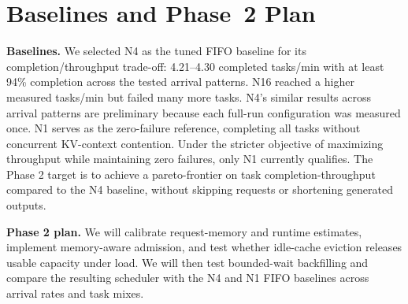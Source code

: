 \documentclass[10pt,twocolumn,letterpaper]{article}
\begin{document}
\balance
\section{Baselines and Phase~2 Plan}
\textbf{Baselines.} We selected N4 as the tuned FIFO baseline for its completion/throughput trade-off: 4.21--4.30 completed tasks/min with at least 94\% completion across the tested arrival patterns. N16 reached a higher measured tasks/min but failed many more tasks. N4's similar results across arrival patterns are preliminary because each full-run configuration was measured once. N1 serves as the zero-failure reference, completing all tasks without concurrent KV-context contention. Under the stricter objective of maximizing throughput while maintaining zero failures, only N1 currently qualifies. The Phase 2 target is to achieve a pareto-frontier on task completion-throughput compared to the N4 baseline, without skipping requests or shortening generated outputs.


\textbf{Phase 2 plan.} We will calibrate request-memory and runtime estimates, implement memory-aware admission, and test whether idle-cache eviction releases usable capacity under load. We will then test bounded-wait backfilling and compare the resulting scheduler with the N4 and N1 FIFO baselines across arrival rates and task mixes.


\clearpage
\onecolumn
\appendix
\end{document}
